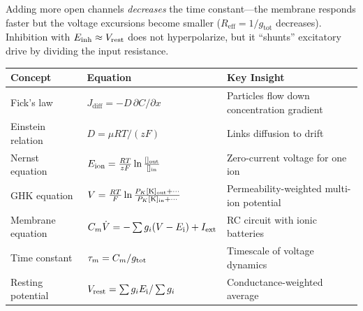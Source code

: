 \begin{aside}
Adding more open channels \emph{decreases} the time constant---the membrane responds faster but the voltage excursions become smaller ($R_{\text{eff}} = 1/g_{\text{tot}}$ decreases). Inhibition with $E_{\mathrm{\text{inh}}} \approx V_{\text{rest}}$ does not hyperpolarize, but it ``shunts'' excitatory drive by dividing the input resistance.
\end{aside}


\begin{chaptersummary}

\begin{center}
\begin{tabularx}{\textwidth}{@{}l X X@{}}
  \toprule
  \textbf{Concept} & \textbf{Equation} & \textbf{Key Insight} \\
  \midrule
  Fick's law &
  $J_{\text{diff}} = -D\,\partial C/\partial x$ &
  Particles flow down concentration gradient \\[6pt]
  Einstein relation &
  $D = \mu RT/(zF)$ &
  Links diffusion to drift \\[6pt]
  Nernst equation &
  $E_{\mathrm{\text{ion}}} = \frac{RT}{zF}\ln\frac{[\mathrm{}]_{\text{out}}}{[\mathrm{}]_{\text{in}}}$ &
  Zero-current voltage for one ion \\[6pt]
  GHK equation &
  $V = \frac{RT}{F}\ln\frac{P_K[\mathrm{K}]_{\text{out}}+\cdots}{P_K[\mathrm{K}]_{\text{in}}+\cdots}$ &
  Permeability-weighted multi-ion potential \\[6pt]
  Membrane equation &
  $C_m\dot{V} = -\sum g_i(V-E_{\mathrm{i}}) + I_{\text{ext}}$ &
  RC circuit with ionic batteries \\[6pt]
  Time constant &
  $\tau_m = C_m / g_{\text{tot}}$ &
  Timescale of voltage dynamics \\[6pt]
  Resting potential &
  $V_{\text{rest}} = \sum g_i E_{\mathrm{i}} / \sum g_i$ &
  Conductance-weighted average \\
  \bottomrule
\end{tabularx}
\end{center}

\end{chaptersummary}

